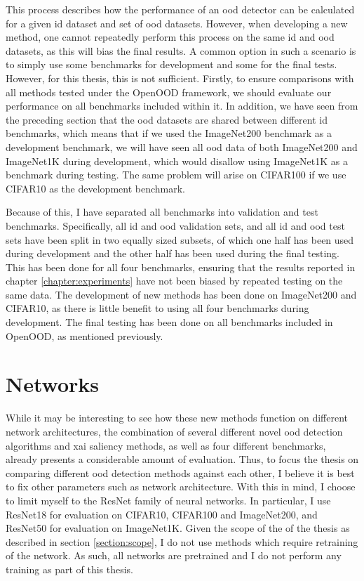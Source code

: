 \documentclass[UKenglish]{uiomasterthesis} %
\theoremstyle{definition}
\begin{document}
This process describes how the performance of an \ac{ood} detector can be calculated for a given \ac{id} dataset and set of \ac{ood} datasets. However, when developing a new method, one cannot repeatedly perform this process on the same \ac{id} and \ac{ood} datasets, as this will bias the final results. A common option in such a scenario is to simply use some benchmarks for development and some for the final tests. However, for this thesis, this is not sufficient. Firstly, to ensure comparisons with all methods tested under the OpenOOD framework, we should evaluate our performance on all benchmarks included within it. In addition, we have seen from the preceding section that the \ac{ood} datasets are shared between different \ac{id} benchmarks, which means that if we used the ImageNet200 benchmark as a development benchmark, we will have seen all \ac{ood} data of both ImageNet200 and ImageNet1K during development, which would disallow using ImageNet1K as a benchmark during testing. The same problem will arise on CIFAR100 if we use CIFAR10 as the development benchmark.

Because of this, I have separated all benchmarks into validation and test benchmarks. Specifically, all \ac{id} and \ac{ood} validation sets, and all \ac{id} and \ac{ood} test sets have been split in two equally sized subsets, of which one half has been used during development and the other half has been used during the final testing. This has been done for all four benchmarks, ensuring that the results reported in chapter \ref{chapter:experiments} have not been biased by repeated testing on the same data. The development of new methods has been done on ImageNet200 and CIFAR10, as there is little benefit to using all four benchmarks during development. The final testing has been done on all benchmarks included in OpenOOD, as mentioned previously.

\section{Networks}

While it may be interesting to see how these new methods function on different network architectures, the combination of several different novel \ac{ood} detection algorithms and \ac{xai} saliency methods, as well as four different benchmarks, already presents a considerable amount of evaluation. Thus, to focus the thesis on comparing different \ac{ood} detection methods against each other, I believe it is best to fix other parameters such as network architecture. With this in mind, I choose to limit myself to the ResNet \cite{resnet} family of neural networks. In particular, I use ResNet18 for evaluation on CIFAR10, CIFAR100 and ImageNet200, and ResNet50 for evaluation on ImageNet1K. Given the scope of the of the thesis as described in section \ref{section:scope}, I do not use methods which require retraining of the network. As such, all networks are pretrained and I do not perform any training as part of this thesis.
\end{document}
